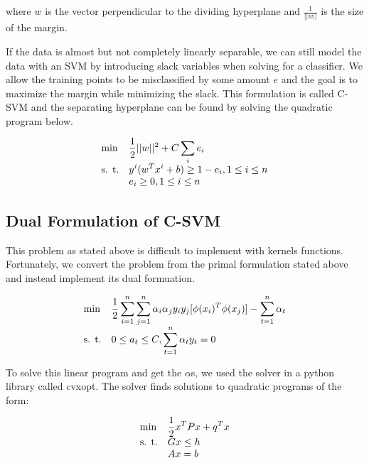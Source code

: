 \documentclass[a4paper,twoside]{article}
\begin{document}
where $w$ is the vector perpendicular to the dividing hyperplane and $\frac{1}{||w||}$ is the size of the margin.

If the data is almost but not completely linearly separable, we can still model the data with an SVM by introducing slack variables when solving for a classifier. We allow the training points to be misclassified by some amount $e$ and the goal is to maximize the margin while minimizing the slack. This formulation is called C-SVM and the separating hyperplane can be found by solving the quadratic program below.

\begin{equation}
\begin{array}{ll@{}ll}
\text{min}  & \displaystyle \frac{1}{2} ||w||^2 + C \sum_i e_i &\\
\text{s. t.}& \displaystyle y^i(w^T x^i + b) \geq 1 - e_i , 1 \leq i \leq n \\
& e_i \geq 0 , 1 \leq i \leq n
\end{array}
\end{equation}

\subsection{Dual Formulation of C-SVM}
This problem as stated above is difficult to implement with kernels functions. Fortunately, we convert the problem from the primal formulation stated above and instead implement its dual formuation.

\begin{equation}
\begin{array}{ll@{}ll}
\text{min}  & \displaystyle \frac{1}{2} \sum_{i=1}^{n} \sum_{j=1}^n \alpha_i \alpha_j y_i y_j [\phi(x_i)^T \phi(x_j)] - \sum_{t=1}^{n} \alpha_t &\\
\text{s. t.}& \displaystyle 0 \leq a_t \leq C , \sum_{t=1}^{n} \alpha_t y_t = 0
\end{array}
\end{equation}

To solve this linear program and get the $\alpha$s, we used the solver in a python library called cvxopt. The solver finds solutions to quadratic programs of the form:

\begin{equation}
\begin{array}{ll@{}ll}
\text{min}  & \displaystyle \frac{1}{2} x^T P x + q^T x &\\
\text{s. t.}& \displaystyle G x \leq h &\\
& Ax = b
\end{array}
\end{equation}
\end{document}
